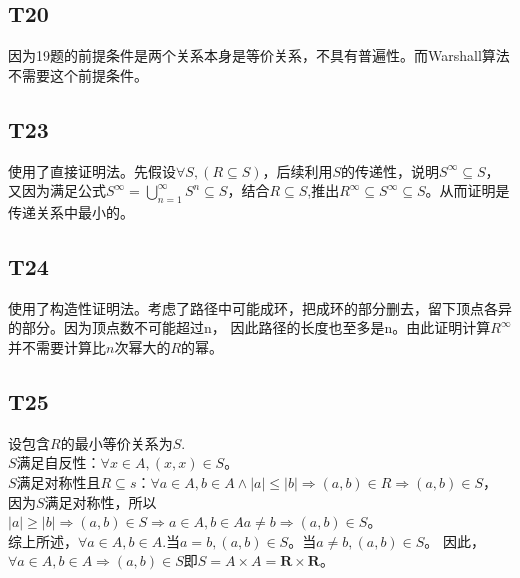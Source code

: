 \documentclass{article}
\begin{document}
\subsection{T20}
因为19题的前提条件是两个关系本身是等价关系，不具有普遍性。而Warshall算法不需要这个前提条件。
\subsection{T23}
使用了直接证明法。先假设$\forall S, (R \subseteq S)$，后续利用$S$的传递性，说明$S^{\infty} \subseteq S$，
又因为满足公式$S^{\infty} = \bigcup_{n = 1}^{\infty}S^n \subseteq S$，结合$R \subseteq S$,推出$R^{\infty} \subseteq
S^{\infty} \subseteq S$。从而证明是传递关系中最小的。
\subsection{T24}
使用了构造性证明法。考虑了路径中可能成环，把成环的部分删去，留下顶点各异的部分。因为顶点数不可能超过n，
因此路径的长度也至多是n。由此证明计算$R^{\infty}$并不需要计算比$n$次幂大的$R$的幂。
\subsection{T25}
设包含$R$的最小等价关系为$S$.\\
$S$满足自反性：$\forall x \in A, (x, x) \in S$。\\
$S$满足对称性且$R \subseteq s$：$\forall a \in A, b \in A \land |a| \leq |b| \Rightarrow (a, b) \in R \Rightarrow (a, b) \in S$，
因为$S$满足对称性，所以$|a| \geq |b| \Rightarrow (a, b)\in S \Rightarrow a \in A, b \in A a \neq b \Rightarrow (a, b) \in S$。\\
综上所述，$\forall a \in A, b \in A.$当$a = b, (a, b) \in S$。当$a \neq b, (a, b) \in S$。
因此，$\forall a \in A, b \in A \Rightarrow (a, b) \in S$即$S = A \times A = \mathbf{R} \times \mathbf{R}$。 
\end{document}
